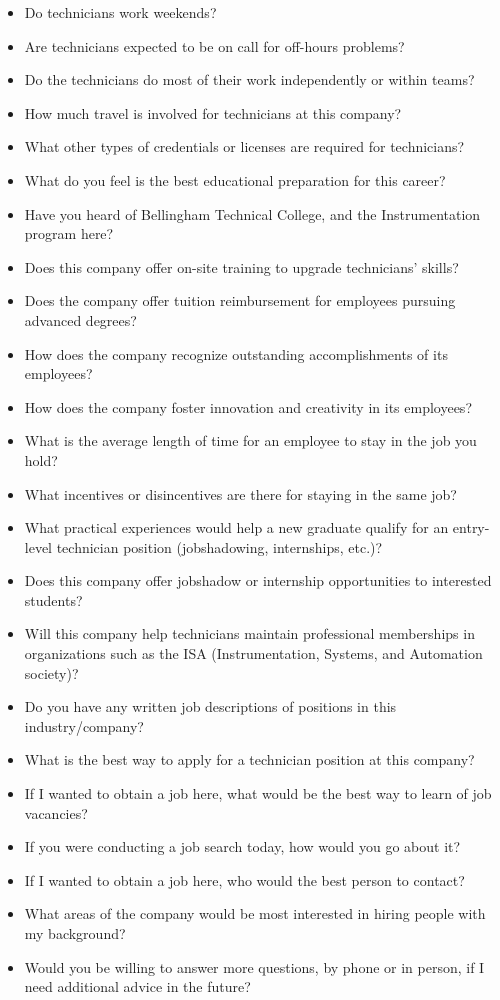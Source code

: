 \begin{itemize}
\item{} Do technicians work weekends?
\item{} Are technicians expected to be on call for off-hours problems?
\item{} Do the technicians do most of their work independently or within teams?
\item{} How much travel is involved for technicians at this company?
\item{} What other types of credentials or licenses are required for technicians?
\item{} What do you feel is the best educational preparation for this career?
\item{} Have you heard of Bellingham Technical College, and the Instrumentation program here?
\item{} Does this company offer on-site training to upgrade technicians' skills?
\item{} Does the company offer tuition reimbursement for employees pursuing advanced degrees?
\item{} How does the company recognize outstanding accomplishments of its employees?
\item{} How does the company foster innovation and creativity in its employees?
\item{} What is the average length of time for an employee to stay in the job you hold?
\item{} What incentives or disincentives are there for staying in the same job?
\item{} What practical experiences would help a new graduate qualify for an entry-level technician position (jobshadowing, internships, etc.)?
\item{} Does this company offer jobshadow or internship opportunities to interested students?
\item{} Will this company help technicians maintain professional memberships in organizations such as the ISA (Instrumentation, Systems, and Automation society)?
\item{} Do you have any written job descriptions of positions in this industry/company?
\item{} What is the best way to apply for a technician position at this company? 
\item{} If I wanted to obtain a job here, what would be the best way to learn of job vacancies?
\item{} If you were conducting a job search today, how would you go about it?
\item{} If I wanted to obtain a job here, who would the best person to contact?
\item{} What areas of the company would be most interested in hiring people with my background?
\item{} Would you be willing to answer more questions, by phone or in person, if I need additional advice in the future?
\end{itemize}





